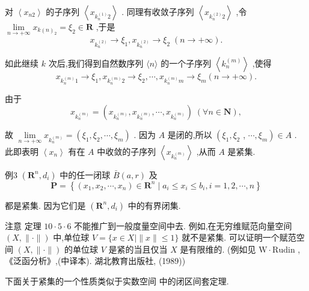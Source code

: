 对 $\left\langle  {x}_{n2}\right\rangle$ 的子序列 $\left\langle  {x}_{{k}_{n}^{\left( 1\right) }2}\right\rangle$ . 同理有收敛子序列 $\left\langle  {x}_{{k}_{n}^{\left( 2\right) }2}\right\rangle$ ,令 $\mathop{\lim }\limits_{{n \rightarrow   + \infty }}{x}_{k{\left( n\right) }_{2}} = {\xi }_{2} \in  \mathbf{R}$ ,于是
$${x}_{{k}_{n}^{\left( 2\right) }} \rightarrow  {\xi }_{1},{x}_{{k}_{n}^{\left( 2\right) }} \rightarrow  {\xi }_{2}\;\left( {n \rightarrow   + \infty }\right) .$$

如此继续 $k$ 次后,我们得到自然数序列 $\langle n\rangle$ 的一个子序列 $\left\langle  {k}_{n}^{\left( m\right) }\right\rangle$ ,使得
$${x}_{{k}_{n}^{\left( m\right) }1} \rightarrow  {\xi }_{1},{x}_{{k}_{n}^{\left( m\right) }2} \rightarrow  {\xi }_{2},\cdots ,{x}_{{k}_{n}^{\left( m\right) }m} \rightarrow  {\xi }_{m}\left( {n \rightarrow   + \infty }\right) .$$

由于
$${x}_{{k}_{n}^{\left( m\right) }} = \left( {{x}_{{k}_{n}^{\left( m\right) }},{x}_{{k}_{n}^{\left( m\right) }},\cdots ,{x}_{{k}_{n}^{\left( m\right) }}}\right) \;\left( {\forall n \in  \mathbf{N}}\right) ,$$

故 $\mathop{\lim }\limits_{{n \rightarrow   + \infty }}{x}_{{k}_{n}^{\left( m\right) }} = \left( {{\xi }_{1},{\xi }_{2},\cdots ,{\xi }_{m}}\right)$ . 因为 $A$ 是闭的,所以 $\left( {{\xi }_{1},{\xi }_{2}}\right.$ , $\left. {\cdots ,{\xi }_{m}}\right)  \in  A$ . 此即表明 $\left\langle  {x}_{n}\right\rangle$ 有在 $A$ 中收敛的子序列 $\left\langle  {x}_{{k}_{n}^{\left( m\right) }}\right\rangle$ ,从而 $A$ 是紧集.

例3 $\left( {{\mathbf{R}}^{n},{d}_{i}}\right)$ 中的任一闭球 $\bar{B}\left( {a,r}\right)$ 及
$$\mathbf{P} = \left\{  {\left( {{x}_{1},{x}_{2},\cdots ,{x}_{n}}\right)  \in  {\mathbf{R}}^{n} \mid  {a}_{i} \leq  {x}_{i} \leq  {b}_{i},i = 1,2,\cdots ,n}\right\}$$

都是紧集. 因为它们是 $\left( {{\mathbf{R}}^{n},{d}_{i}}\right)$ 中的有界闭集.

注意 定理 ${10} \cdot  5 \cdot  6$ 不能推广到一般度量空间中去. 例如,在无穷维赋范向量空间 $\left( {X,\parallel  \cdot  \parallel }\right)$ 中,单位球 $V = \{ x \in  X \mid  \parallel x\parallel  \leq  1\}$ 就不是紧集. 可以证明一个赋范空间 $\left( {X,\parallel  \cdot  \parallel }\right)$ 的单位球 $V$ 是紧的当且仅当 $X$ 是有限维的. (例如见 $\mathrm{W} \cdot  \mathrm{{Rudin}}$ ,《泛函分析》,(中译本). 湖北教育出版社, (1989))

下面关于紧集的一个性质类似于实数空间 中的闭区间套定理.

